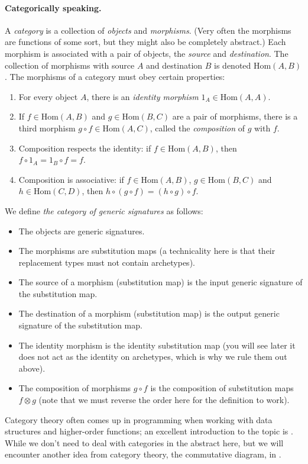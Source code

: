 \documentclass[../generics]{subfiles}
\begin{document}
\paragraph{Categorically speaking.}
A \emph{category} is a collection of \emph{objects} and \emph{morphisms}. (Very often the morphisms are functions of some sort, but they might also be completely abstract.) Each morphism is associated with a pair of objects, the \emph{source} and \emph{destination}. The collection of morphisms with source $A$ and destination $B$ is denoted $\mathrm{Hom}(A,B)$. The morphisms of a category must obey certain properties:
\begin{enumerate}
\item For every object $A$, there is an \emph{identity morphism} $1_A\in\mathrm{Hom}(A, A)$.
\item If $f\in\mathrm{Hom}(A, B)$ and $g\in\mathrm{Hom}(B, C)$ are a pair of morphisms, there is a third morphism $g\circ f\in\mathrm{Hom}(A,C)$, called the \emph{composition} of $g$ with $f$.
\item Composition respects the identity: if $f\in\mathrm{Hom}(A, B)$, then $f\circ 1_A=1_B\circ f=f$.
\item Composition is associative: if $f\in\mathrm{Hom}(A, B)$, $g\in\mathrm{Hom}(B, C)$ and $h\in\mathrm{Hom}(C, D)$, then $h\circ(g\circ f)=(h\circ g)\circ f$.
\end{enumerate}
We define \emph{the category of generic signatures} as follows:
\begin{itemize}
\item The objects are generic signatures.
\item The morphisms are substitution maps (a technicality here is that their replacement types must not contain archetypes).
\item The source of a morphism (substitution map) is the input generic signature of the substitution map.
\item The destination of a morphism (substitution map) is the output generic signature of the substitution map.
\item The identity morphism is the identity substitution map (you will see later it does not act as the identity on archetypes, which is why we rule them out above).
\item The composition of morphisms $g\circ f$ is the composition of substitution maps $f\otimes g$ (note that we must reverse the order here for the definition to work).
\end{itemize}
Category theory often comes up in programming when working with data structures and higher-order functions; an excellent introduction to the topic is \cite{catprogrammer}. While we don't need to deal with categories in the abstract here, but we will encounter another idea from category theory, the commutative diagram, in .
\end{document}

